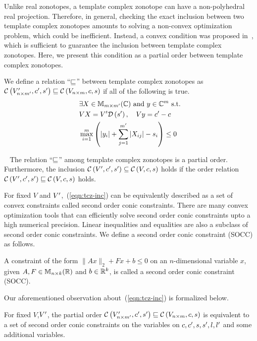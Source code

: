 %
Unlike real zonotopes, a template complex zonotope can have a
non-polyhedral real projection.  Therefore, in general, checking the
exact inclusion between two template complex zonotopes amounts to
solving a non-convex optimization problem, which could be inefficient.
Instead, a convex condition was proposed in~\cite{tcz2017}, which is
sufficient to guarantee the inclusion between template complex
zonotopes.  Here, we present this condition as a partial order between
template complex zonotopes.
%
\begin{definition}
We define a relation ``$\order$'' between template complex zonotopes
as\\ $\cz{V^\pr_{n\times m^\pr}}{c^\pr}{s^\pr}\order \cz{V_{n\times
    m}}{c}{s}$ if all of the following is true.
\begin{align}~\label{eqn:tcz-inc}
\begin{split}
& \exists X\in\mat{m}{m^\pr}{\mb{C}}~\text{and}~y\in\mb{C}^{m}~\text{s.t.}\\
& \transfer{V}{V^\pr}{s^\pr}{X},~~~\centertransfer{V}{c}{c^\pr}{y}\\
& \scalebound{X}{y}{s}{m}{m^\pr}\leq 0\\
\end{split}
\end{align}
\end{definition}
%
\begin{lemma}~\label{lem:zon-zon} The relation ``$\order$'' among
template complex zonotopes is a partial order.  Furthermore, the
inclusion $\cz{V^\pr}{c^\pr}{s^\pr}\subseteq \cz{V}{c}{s}$ holds if
the order relation $\cz{{V^\pr}}{c^\pr}{s^\pr}\order \cz{V}{c}{s}$ holds.
\end{lemma}
%
For fixed $V$ and $V^\pr$,~(\ref{eqn:tcz-inc}) can be equivalently
described as a set of convex constraints called second order conic
constraints.  There are many convex optimization tools that can
efficiently solve second order conic constraints upto a high numerical
precision.  Linear inequalities and equalities are also a subclass of
second order conic constraints.  We define a second order conic
constraint (SOCC) as follows.
%
\begin{definition}[SOCC]
A constraint of the form $\|Ax\|_{2}+Fx+b\leq 0$ on an $n$-dimensional
variable $x$, given $A,F\in\mat{n}{k}{\realset}$ and $b\in\mb{R}^k$, is
called a second order conic constraint (SOCC).
\end{definition}
%
   Our aforementioned observation about~(\ref{eqn:tcz-inc}) is
 formalized below.
%
\begin{lemma}
For fixed $V$,$V^\pr$, the partial order $\cz{V^\pr_{n\times
    m^\pr}}{c^\pr}{s^\pr}\order \cz{V_{n\times m}}{c}{s}$ is
    equivalent to a set of second order conic constraints on the
    variables on $c,c^\pr,s,s^\pr,l,l^\pr$ and some additional
    variables.
\end{lemma}
